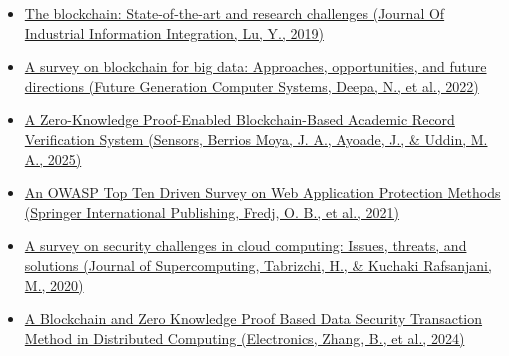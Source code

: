 \documentclass[conference]{IEEEtran}
\begin{document}
\begin{itemize}
    \item 
    \href{https://doi.org/10.1016/j.jii.2019.04.002}{The blockchain: State-of-the-art and research challenges (Journal Of Industrial Information Integration, Lu, Y., 2019)}

    \item 
    \href{https://doi.org/10.1016/j.future.2022.01.017}{A survey on blockchain for big data: Approaches, opportunities, and future directions (Future Generation Computer Systems, Deepa, N., et al., 2022)}

    \item \begin{otherlanguage}{english}
    \href{https://doi.org/10.3390/s25113450}{A Zero-Knowledge Proof-Enabled Blockchain-Based Academic Record Verification System (Sensors, Berrios Moya, J. A., Ayoade, J., \& Uddin, M. A., 2025)}
    \end{otherlanguage}
    \item 
    \href{https://doi.org/10.1007/978-3-030-68887-5_14}{An OWASP Top Ten Driven Survey on Web Application Protection Methods (Springer International Publishing, Fredj, O. B., et al., 2021)}

    \item 
    \href{https://doi.org/10.1007/s11227-020-03213-1}{A survey on security challenges in cloud computing: Issues, threats, and solutions (Journal of Supercomputing, Tabrizchi, H., \& Kuchaki Rafsanjani, M., 2020)}

    \item 
    \href{https://doi.org/10.3390/electronics13214260}{A Blockchain and Zero Knowledge Proof Based Data Security Transaction Method in Distributed Computing (Electronics, Zhang, B., et al., 2024)}
\end{itemize}
\end{document}

